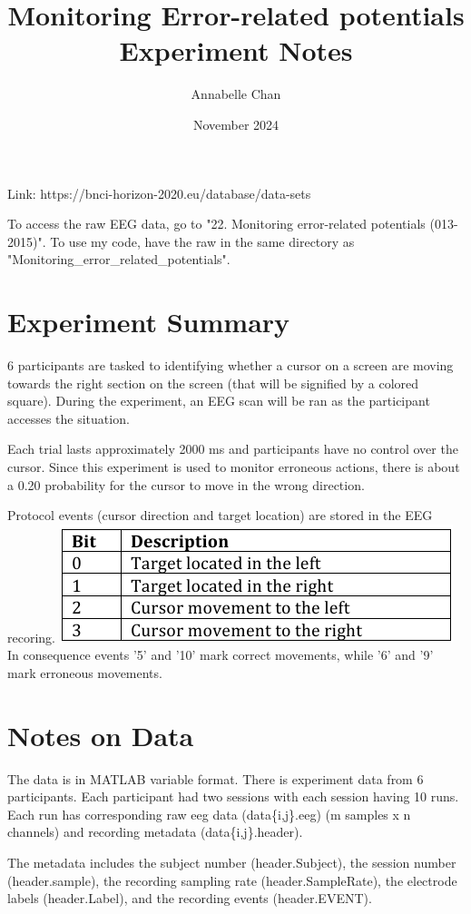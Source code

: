 \documentclass[12pt]{article}
\title{Monitoring Error-related potentials Experiment Notes}
\author{Annabelle Chan}
\date{November 2024}
\begin{document}
\maketitle
Link: https://bnci-horizon-2020.eu/database/data-sets\newline

To access the raw EEG data, go to "22. Monitoring error-related potentials (013-2015)". To use my code, have the raw in the same directory as "Monitoring\_error\_related\_potentials".
\section{Experiment Summary}
6 participants are tasked to identifying whether a cursor on a screen are moving towards the right section on the screen (that will be signified by a colored square). During the experiment, an EEG scan will be ran as the participant accesses the situation.

Each trial lasts approximately 2000 ms and participants have no control over the cursor. Since this experiment is used to monitor erroneous actions, there is about a 0.20 probability for the cursor to move in the wrong direction.

Protocol events (cursor direction and target location) are stored in the EEG recoring. 
\includegraphics[scale=1]{ProtocolEventTable}
In consequence events '5' and '10' mark correct movements, while '6' and '9' mark erroneous movements.

\section{Notes on Data}
The data is in MATLAB variable format. There is experiment data from 6 participants. Each participant had two sessions with each session having 10 runs. Each run has corresponding raw eeg data (data\{i,j\}.eeg) (m samples x n channels) and recording metadata (data\{i,j\}.header). 

The metadata includes the subject number (header.Subject), the session number (header.sample), the recording sampling rate (header.SampleRate), the electrode labels (header.Label), and the recording events (header.EVENT).
\end{document}
